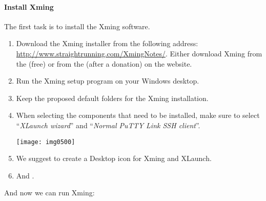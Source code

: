 \ifwindows
  \paragraph{Install Xming}

  The first task is to install the Xming software.

  \begin{enumerate}
    \item  Download the Xming installer from the following
      address: \url{http://www.straightrunning.com/XmingNotes/}. Either download Xming
      from the  (free) or from the  (after a donation) on the website.
    \item  Run the Xming setup program on your Windows desktop.
    \item  Keep the proposed default folders for the Xming installation.
    \item  When selecting the components that need to be installed, make sure to
      select ``\emph{XLaunch wizard}'' and ``\emph{Normal PuTTY Link SSH client}''.

  \texttt{[image: img0500]}

  \item  We suggest to create a Desktop icon for Xming and XLaunch.
  \item  And .
  \end{enumerate}

  And now we can run Xming:

